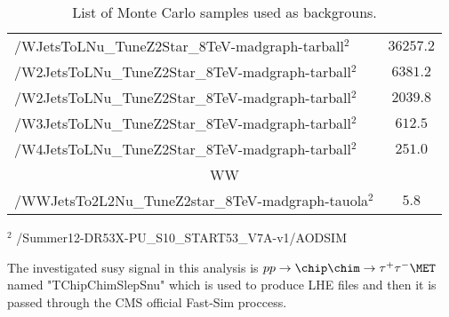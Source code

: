 \begin{table}[!ht]
\begin{center}
{\begin{tabular}{|l|c|}
/WJetsToLNu\_TuneZ2Star\_8TeV-madgraph-tarball$^{2}$          &  $36257.2$              \\
/W2JetsToLNu\_TuneZ2Star\_8TeV-madgraph-tarball$^{2}$         &  $6381.2$               \\
/W2JetsToLNu\_TuneZ2Star\_8TeV-madgraph-tarball$^{2}$         &  $2039.8$               \\
/W3JetsToLNu\_TuneZ2Star\_8TeV-madgraph-tarball$^{2}$         &  $612.5$               \\
/W4JetsToLNu\_TuneZ2Star\_8TeV-madgraph-tarball$^{2}$         &  $251.0$                \\
\hline
\multicolumn{2}{|c|}{WW}\\
\hline
/WWJetsTo2L2Nu\_TuneZ2star\_8TeV-madgraph-tauola$^{2}$        &  $5.8$                \\

\hline

\end{tabular}
}
\end{center}
$^{2}$ /Summer12-DR53X-PU\_S10\_START53\_V7A-v1/AODSIM\\

\caption{ 
  List of Monte Carlo samples used as backgrouns.
}
\label{Tab.MCSamples}

\end{table}

The investigated susy signal in this analysis is $pp \rightarrow \chip \chim \rightarrow \tau^+ \tau^- \MET$ named "TChipChimSlepSnu" which \PYTHIA is used to produce LHE files and then it is passed through the CMS official Fast-Sim proccess.
